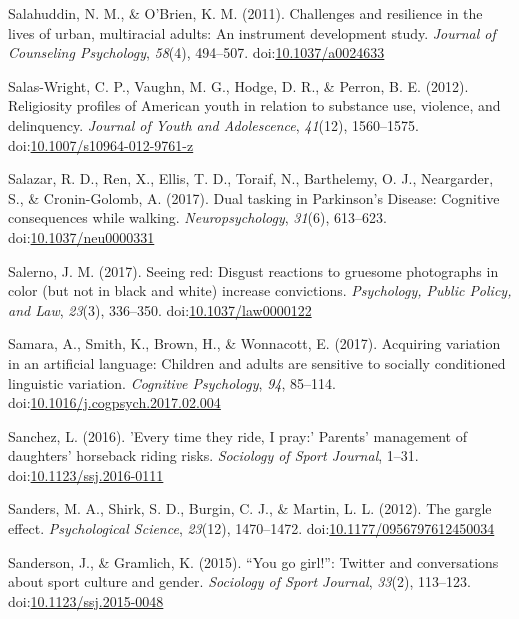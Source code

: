 \documentclass[english,man]{apa6}
\begin{document}
\hypertarget{ref-Salahuddin2011}{}
Salahuddin, N. M., \& O'Brien, K. M. (2011). Challenges and resilience
in the lives of urban, multiracial adults: An instrument development
study. \emph{Journal of Counseling Psychology}, \emph{58}(4), 494--507.
doi:\href{https://doi.org/10.1037/a0024633}{10.1037/a0024633}

\hypertarget{ref-Salas-Wright2012}{}
Salas-Wright, C. P., Vaughn, M. G., Hodge, D. R., \& Perron, B. E.
(2012). Religiosity profiles of American youth in relation to substance
use, violence, and delinquency. \emph{Journal of Youth and Adolescence},
\emph{41}(12), 1560--1575.
doi:\href{https://doi.org/10.1007/s10964-012-9761-z}{10.1007/s10964-012-9761-z}

\hypertarget{ref-Salazar2017}{}
Salazar, R. D., Ren, X., Ellis, T. D., Toraif, N., Barthelemy, O. J.,
Neargarder, S., \& Cronin-Golomb, A. (2017). Dual tasking in Parkinson's
Disease: Cognitive consequences while walking. \emph{Neuropsychology},
\emph{31}(6), 613--623.
doi:\href{https://doi.org/10.1037/neu0000331}{10.1037/neu0000331}

\hypertarget{ref-Salerno2017}{}
Salerno, J. M. (2017). Seeing red: Disgust reactions to gruesome
photographs in color (but not in black and white) increase convictions.
\emph{Psychology, Public Policy, and Law}, \emph{23}(3), 336--350.
doi:\href{https://doi.org/10.1037/law0000122}{10.1037/law0000122}

\hypertarget{ref-Samara2017}{}
Samara, A., Smith, K., Brown, H., \& Wonnacott, E. (2017). Acquiring
variation in an artificial language: Children and adults are sensitive
to socially conditioned linguistic variation. \emph{Cognitive
Psychology}, \emph{94}, 85--114.
doi:\href{https://doi.org/10.1016/j.cogpsych.2017.02.004}{10.1016/j.cogpsych.2017.02.004}

\hypertarget{ref-Sanchez2016}{}
Sanchez, L. (2016). 'Every time they ride, I pray:' Parents' management
of daughters' horseback riding risks. \emph{Sociology of Sport Journal},
1--31.
doi:\href{https://doi.org/10.1123/ssj.2016-0111}{10.1123/ssj.2016-0111}

\hypertarget{ref-Sanders2012}{}
Sanders, M. A., Shirk, S. D., Burgin, C. J., \& Martin, L. L. (2012).
The gargle effect. \emph{Psychological Science}, \emph{23}(12),
1470--1472.
doi:\href{https://doi.org/10.1177/0956797612450034}{10.1177/0956797612450034}

\hypertarget{ref-Sanderson2015}{}
Sanderson, J., \& Gramlich, K. (2015). ``You go girl!'': Twitter and
conversations about sport culture and gender. \emph{Sociology of Sport
Journal}, \emph{33}(2), 113--123.
doi:\href{https://doi.org/10.1123/ssj.2015-0048}{10.1123/ssj.2015-0048}
\end{document}
